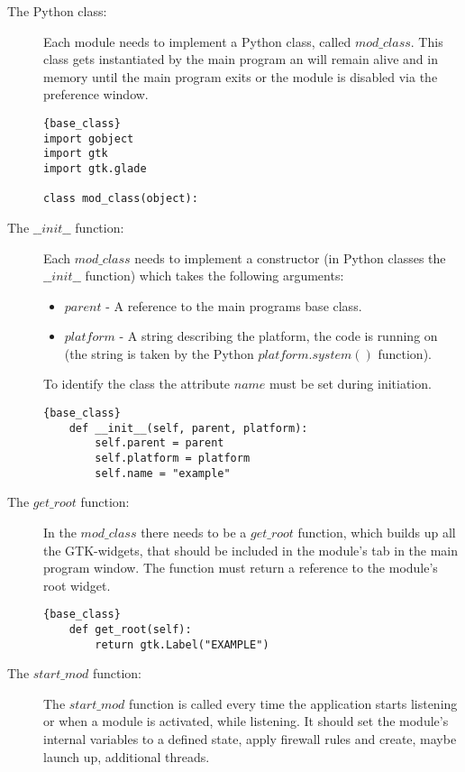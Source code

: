 \documentclass[a4paper, 11pt]{article}
\begin{document}
            \begin{description}
                \item[The Python class:] Each module needs to implement a Python class, called $mod\_class$. This class gets instantiated by the main program an will remain alive and in memory until the main program exits or the module is disabled via the preference window.

                \begin{lstlisting}[caption=Python class]{base_class}
import gobject
import gtk
import gtk.glade

class mod_class(object):
                \end{lstlisting}
                
                \item[The $\_\_init\_\_$ function:] Each $mod\_class$ needs to implement a constructor (in Python classes the $\_\_init\_\_$ function) which takes the following arguments:
                    \begin{itemize}
                        \item $parent$ - A reference to the main programs base class.
                        \item $platform$ - A string describing the platform, the code is running on (the string is taken by the Python $platform.system()$ function).
                    \end{itemize}
                To identify the class the attribute $name$ must be set during initiation.

                \begin{lstlisting}[caption=Constructor]{base_class}
    def __init__(self, parent, platform):
        self.parent = parent
        self.platform = platform
        self.name = "example"   
                \end{lstlisting}
                             
                \item[The $get\_root$ function:] In the $mod\_class$ there needs to be a $get\_root$ function, which builds up all the GTK-widgets, that should be included in the module's tab in the main program window. The function must return a reference to the module's root widget.
                
                \begin{lstlisting}[caption=The GTK part]{base_class}
    def get_root(self):
        return gtk.Label("EXAMPLE")
                \end{lstlisting}
                \item[The $start\_mod$ function:] The $start\_mod$ function is called every time the application starts listening or when a module is activated, while listening. It should set the module's internal variables to a defined state, apply firewall rules and create, maybe launch up, additional threads.


\end{description}
\end{document}
